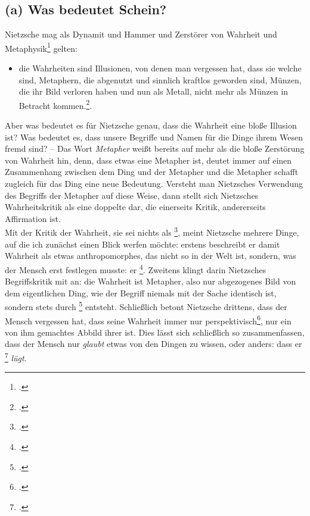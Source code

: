 \documentclass[12pt, a4paper, openany]{report}
\begin{document}
\subsection{(a) Was bedeutet Schein?}
Nietzsche mag als Dynamit und Hammer und Zerstörer von Wahrheit und Metaphysik\footcite[Vgl.][59]{stephan_nietzscheanismus_2019} gelten: 
\begin{itemize}
    \item[] die Wahrheiten sind Illusionen, von denen man vergessen hat, dass sie welche sind, Metaphern, die abgenutzt und sinnlich kraftlos geworden sind, Münzen, die ihr Bild verloren haben und nun als Metall, nicht mehr als Münzen in Betracht kommen.\footcite[][881]{nietzsche_geburt_1999}. 
\end{itemize}
Aber was bedeutet es für Nietzsche genau, dass die Wahrheit eine bloße Illusion ist? 
Was bedeutet es, dass unsere Begriffe und Namen für die Dinge ihrem Wesen fremd sind?
-- Das Wort \emph{Metapher} weißt bereits auf mehr als die bloße Zerstörung von Wahrheit hin, denn, dass etwas eine Metapher ist, deutet immer auf einen Zusammenhang zwischen dem Ding und der Metapher und die Metapher schafft zugleich für das Ding eine neue Bedeutung. 
Versteht man Nietzsches Verwendung des Begriffs der Metapher auf diese Weise, dann stellt sich Nietzsches Wahrheitskritik als eine doppelte dar, die einerseits Kritik, andererseits Affirmation ist.\\

Mit der Kritik der Wahrheit, sie sei nichts als \footcite[][880]{nietzsche_geburt_1999}, meint Nietzsche mehrere Dinge, auf die ich zunächst einen Blick werfen möchte: 
erstens beschreibt er damit Wahrheit als etwas anthropomorphes, das nicht so in der Welt ist, sondern, was der Mensch erst festlegen musste: er \footcite[][877]{nietzsche_geburt_1999}.
Zweitens klingt darin Nietzsches Begriffskritik mit an:
die Wahrheit ist Metapher, also nur abgezogenes Bild von dem eigentlichen Ding, wie der Begriff niemals mit der Sache identisch ist, sondern stets durch \footcite[][880]{nietzsche_geburt_1999} entsteht.
Schließlich betont Nietzsche drittens, dass der Mensch vergessen hat, dass seine Wahrheit immer nur perspektivisch\footcite[Vgl.][364]{nietzsche_jenseits_2014}, nur ein von ihm gemachtes Abbild ihrer ist. 
Dies lässt sich schließlich so zusammenfassen, dass der Mensch nur \emph{glaubt} etwas von den Dingen zu wissen, oder anders: dass er \footcite[][881]{nietzsche_geburt_1999} \emph{lügt}.\\
\end{document}
